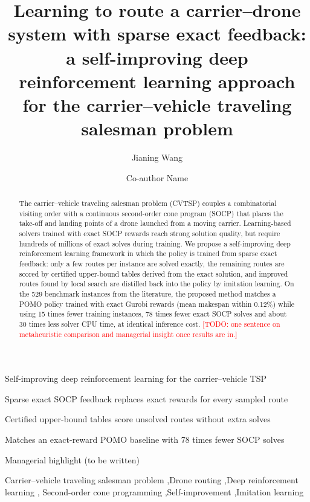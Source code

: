 \documentclass[preprint,review,12pt,authoryear]{elsarticle}
\newcommand{\todo}[1]{\textcolor{red}{[TODO: #1]}}
\begin{document}
\begin{frontmatter}

\title{Learning to route a carrier--drone system with sparse exact feedback:
a self-improving deep reinforcement learning approach for the carrier--vehicle traveling salesman problem}

\author[a]{Jianing Wang}
\author[a]{Co-author Name}

\begin{abstract}
The carrier--vehicle traveling salesman problem (CVTSP) couples a combinatorial visiting order with a
continuous second-order cone program (SOCP) that places the take-off and landing points of a drone
launched from a moving carrier. Learning-based solvers trained with exact SOCP rewards reach strong
solution quality, but require hundreds of millions of exact solves during training.
We propose a self-improving deep reinforcement learning framework in which the policy is trained from
sparse exact feedback: only a few routes per instance are solved exactly, the remaining routes are
scored by certified upper-bound tables derived from the exact solution, and improved routes found by
local search are distilled back into the policy by imitation learning.
On the 529 benchmark instances from the literature, the proposed method matches a POMO policy trained
with exact Gurobi rewards (mean makespan within 0.12\%) while using 15 times fewer training instances,
78 times fewer exact SOCP solves and about 30 times less solver CPU time, at identical inference cost.
\todo{one sentence on metaheuristic comparison and managerial insight once results are in.}
\end{abstract}

\begin{highlights}
\item Self-improving deep reinforcement learning for the carrier--vehicle TSP
\item Sparse exact SOCP feedback replaces exact rewards for every sampled route
\item Certified upper-bound tables score unsolved routes without extra solves
\item Matches an exact-reward POMO baseline with 78 times fewer SOCP solves
\item Managerial highlight (to be written)
\end{highlights}

\begin{keyword}
Carrier--vehicle traveling salesman problem \sep Drone routing \sep Deep reinforcement learning \sep
Second-order cone programming \sep Self-improvement \sep Imitation learning
\end{keyword}

\end{frontmatter}
\end{document}

